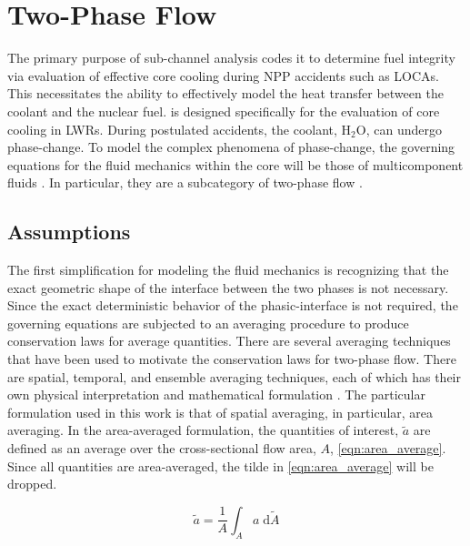 \section{Two-Phase Flow}
\label{sect:two_phase_flow}
The primary purpose of sub-channel analysis codes it to determine fuel integrity via evaluation of effective core cooling during NPP accidents such as LOCAs.
This necessitates the ability to effectively model the heat transfer between the coolant and the nuclear fuel. 
\cobra{} is designed specifically for the evaluation of core cooling in LWRs.
During postulated accidents, the coolant, H$_2$O, can undergo phase-change.
To model the complex phenomena of phase-change, the governing equations for the fluid mechanics within the core will be those of multicomponent fluids \cite{Drew1998}.
In particular, they are a subcategory of two-phase flow \cite{Todreas2011, Stewart1984, Ishii1984}.

\subsection{Assumptions}
\label{subsect:assumptions}

The first simplification for modeling the fluid mechanics is recognizing that the exact geometric shape of the interface between the two phases is not necessary.
Since the exact deterministic behavior of the phasic-interface is not required, the governing equations are subjected to an averaging procedure to produce conservation laws for average quantities.
There are several averaging techniques that have been used to motivate the conservation laws for two-phase flow.
There are spatial, temporal, and ensemble averaging techniques, each of which has their own physical interpretation and mathematical formulation \cite{Drew1998, Todreas2011}.
The particular formulation used in this work is that of spatial averaging, in particular, area averaging.
In the area-averaged formulation, the quantities of interest, $\tilde{a}$ are defined as an average over the cross-sectional flow area, $A$, \eqref{eqn:area_average}.
Since all quantities are area-averaged, the tilde in \eqref{eqn:area_average} will be dropped.

\begin{equation}
\label{eqn:area_average}
\tilde{a} = \frac{1}{A}\int_{A} a \;\mathrm{d}\tilde{A}
\end{equation}

